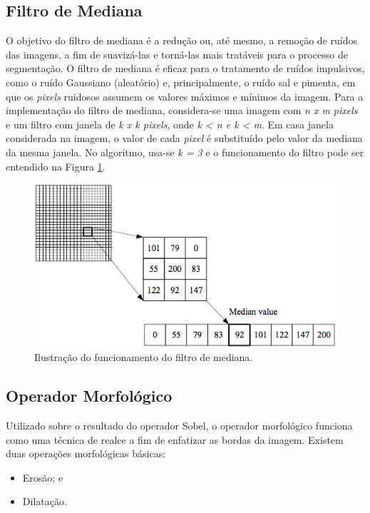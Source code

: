 \subsection*{Filtro de Mediana}
O objetivo do filtro de mediana é a redução ou, até mesmo, a remoção de ruídos das imagens, a fim de suavizá-las e torná-las mais tratáveis para o processo de segmentação. O filtro de mediana é eficaz para o tratamento de ruídos impulsivos, como o ruído Gaussiano (aleatório) e, principalmente, o ruído sal e pimenta, em que os \textit{pixels} ruidosos assumem os valores máximos e mínimos da imagem.
Para a implementação do filtro de mediana, considera-se uma imagem com \textit{n x m pixels} e um filtro com janela de \textit{k x k pixels}, onde \textit{k < n e k < m}. Em casa janela considerada na imagem, o valor de cada \textit{pixel} é substituído pelo valor da mediana da mesma janela. No algoritmo, usa-se \textit{k = 3} e o funcionamento do filtro pode ser entendido na Figura \ref{fig:filtromediana}.

	\begin{figure}[!htb]
       \begin{center}  
          \includegraphics[width=0.8\columnwidth]{img/filtromediana.jpg}
           \caption{\label{fig:filtromediana}Ilustração do funcionamento do filtro de mediana.}
       \end{center}
   \end{figure}
   

\subsection*{Operador Morfológico}
Utilizado sobre o resultado do operador Sobel, o operador morfológico funciona como uma técnica de realce a fim de enfatizar as bordas da imagem. 
Existem duas operações morfológicas básicas:
\begin{itemize}
    \item Erosão; e
    \item Dilatação.
\end{itemize}    

